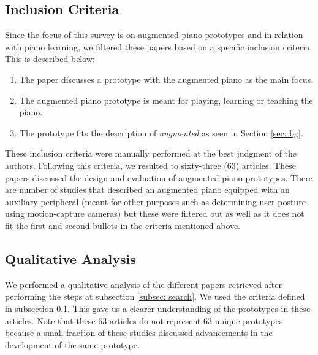 \documentclass[sigchi, review]{acmart}
\begin{document}
\subsection{Inclusion Criteria}
\label{subsec: criteria}
Since the focus of this survey is on augmented piano prototypes and in relation with piano learning, we filtered these papers based on a specific inclusion criteria. This is described below: 
\begin{enumerate}
    \item The paper discusses a prototype with the augmented piano as the main focus.  
    \item The augmented piano prototype is meant for playing, learning or teaching the piano.
    \item The prototype fits the description of \textit{augmented} as seen in Section \ref{sec: bg}.
\end{enumerate}
These inclusion criteria were manually performed at the best judgment of the authors. Following this criteria, we resulted to sixty-three (63) articles. These papers discussed the design and evaluation of augmented piano prototypes. There are number of studies that described an augmented piano equipped with an auxiliary peripheral (meant for other purposes such as determining user posture using motion-capture cameras) but these were filtered out as well as it does not fit the first and second bullets in the criteria mentioned above.  

\subsection{Qualitative Analysis}
We performed a qualitative analysis of the different papers retrieved after performing the steps at subsection \ref{subsec: search}. We used the criteria defined in subsection \ref{subsec: criteria}. This gave us a clearer understanding of the prototypes in these articles. Note that these 63 articles do not represent 63 unique prototypes because a small fraction of these studies discussed advancements in the development of the same prototype.
\end{document}
